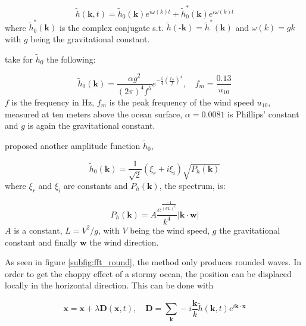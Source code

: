 \begin{equation}
    \tilde{h}(\textbf{k}, t) = \tilde{h}_0(\textbf{k}) e^{i\omega(k)t} +
    \tilde{h}_0^*(\textbf{k}) e^{i\omega(k)t}
\end{equation}
%
where $\tilde{h}_0^*(\textbf{k})$ is the complex conjugate s.t.
$\tilde{h}(\textbf{-k})=\tilde{h}^*(\textbf{k})$ and $\omega(k)=gk$ with $g$
being the gravitational constant.

\citeauthor{mastin1987fourier} take for $\tilde{h}_0$ the following:

\begin{equation}
    \tilde{h}_0(\textbf{k}) = \frac{\alpha g^2}{{(2\pi)}^4 f^5}
    e^{-\frac{5}{4}{(\frac{f_m}{f})}^4}, \quad f_m=\frac{0.13}{u_{10}}
\end{equation}
%
$f$ is the frequency in Hz, $f_m$ is the peak frequency of the wind speed
$u_{10}$, measured at ten meters above the ocean surface, $\alpha=0.0081$ is
Phillips' constant and $g$ is again the gravitational constant.

\citeauthor{tessendorf2001simulating} proposed another amplitude function
$\tilde{h}_0$, 

\begin{equation}\label{eq:tessendorf_h0}
    \tilde{h}_0(\textbf{k}) = \frac{1}{\sqrt{2}}(\xi_r +
    i\xi_i)\sqrt{P_h(\textbf{k})}
\end{equation}
%
where $\xi_r$ and $\xi_i$ are constants and $P_h(\textbf{k})$, the spectrum, is:

\begin{equation}
    P_h(\textbf{k}) = A\frac{e^{\frac{-1}{{(kL)}^2}}}{k^4}
    |\textbf{k}\cdot\textbf{w}|
\end{equation}
%
$A$ is a constant, $L=V^2/g$, with $V$ being the wind speed, $g$ the
gravitational constant and finally $\textbf{w}$ the wind direction.

As seen in figure \autoref{subfig:fft_round}, the method only produces rounded
waves. In order to get the choppy effect of a stormy ocean, the position can be
displaced locally in the horizontal direction. This can be done with

\begin{equation}
    \textbf{x} = \textbf{x} + \lambda \textbf{D}(\textbf{x}, t), \quad
    \textbf{D} = \sum_{\textbf{k}}^{} -i\frac{\textbf{k}}{k}
    \tilde{h}(\textbf{k},t) e^{i\textbf{k}\cdot\textbf{x}}
\end{equation}

